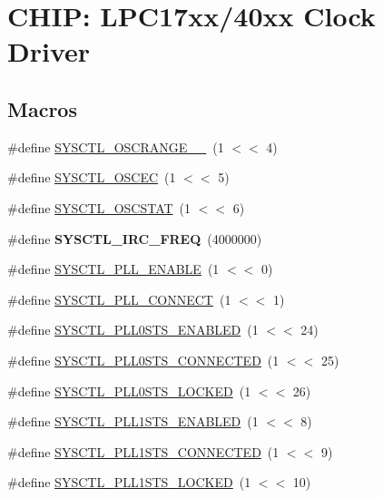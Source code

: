 \hypertarget{group___c_l_o_c_k__17_x_x__40_x_x}{\section{C\+H\+I\+P\+: L\+P\+C17xx/40xx Clock Driver}
\label{group___c_l_o_c_k__17_x_x__40_x_x}
}
\subsection*{Macros}
\begin{DoxyCompactItemize}
\item 
\#define \hyperlink{group___c_l_o_c_k__17_x_x__40_x_x_gaf04369ab801acde194d9ffa65437364b}{S\+Y\+S\+C\+T\+L\+\_\+\+O\+S\+C\+R\+A\+N\+G\+E\+\_\+\_}~(1 $<$$<$ 4)
\item 
\#define \hyperlink{group___c_l_o_c_k__17_x_x__40_x_x_ga590cc793271161c9b49e27345956b527}{S\+Y\+S\+C\+T\+L\+\_\+\+O\+S\+C\+E\+C}~(1 $<$$<$ 5)
\item 
\#define \hyperlink{group___c_l_o_c_k__17_x_x__40_x_x_gae0252af1bba39952df3137fc471ae395}{S\+Y\+S\+C\+T\+L\+\_\+\+O\+S\+C\+S\+T\+A\+T}~(1 $<$$<$ 6)
\item 
\hypertarget{group___c_l_o_c_k__17_x_x__40_x_x_gadec816f1cc26d1b3c4a954d5e791e9c0}{\#define {\bfseries S\+Y\+S\+C\+T\+L\+\_\+\+I\+R\+C\+\_\+\+F\+R\+E\+Q}~(4000000)}\label{group___c_l_o_c_k__17_x_x__40_x_x_gadec816f1cc26d1b3c4a954d5e791e9c0}

\item 
\#define \hyperlink{group___c_l_o_c_k__17_x_x__40_x_x_ga78f6b62e70d59854ada7a72d6a01893d}{S\+Y\+S\+C\+T\+L\+\_\+\+P\+L\+L\+\_\+\+E\+N\+A\+B\+L\+E}~(1 $<$$<$ 0)
\item 
\#define \hyperlink{group___c_l_o_c_k__17_x_x__40_x_x_ga4e33171ff00818ed7a62cd953eadc725}{S\+Y\+S\+C\+T\+L\+\_\+\+P\+L\+L\+\_\+\+C\+O\+N\+N\+E\+C\+T}~(1 $<$$<$ 1)
\item 
\#define \hyperlink{group___c_l_o_c_k__17_x_x__40_x_x_gac41b20558f47e27cbe618dbe33db470a}{S\+Y\+S\+C\+T\+L\+\_\+\+P\+L\+L0\+S\+T\+S\+\_\+\+E\+N\+A\+B\+L\+E\+D}~(1 $<$$<$ 24)
\item 
\#define \hyperlink{group___c_l_o_c_k__17_x_x__40_x_x_ga6ed64c74717a9360b3f6ee8756c5cfd0}{S\+Y\+S\+C\+T\+L\+\_\+\+P\+L\+L0\+S\+T\+S\+\_\+\+C\+O\+N\+N\+E\+C\+T\+E\+D}~(1 $<$$<$ 25)
\item 
\#define \hyperlink{group___c_l_o_c_k__17_x_x__40_x_x_ga6facab939c95a89e63fc07b960f0348a}{S\+Y\+S\+C\+T\+L\+\_\+\+P\+L\+L0\+S\+T\+S\+\_\+\+L\+O\+C\+K\+E\+D}~(1 $<$$<$ 26)
\item 
\#define \hyperlink{group___c_l_o_c_k__17_x_x__40_x_x_gabb0301239d0c370ef97a1e9463f9d17d}{S\+Y\+S\+C\+T\+L\+\_\+\+P\+L\+L1\+S\+T\+S\+\_\+\+E\+N\+A\+B\+L\+E\+D}~(1 $<$$<$ 8)
\item 
\#define \hyperlink{group___c_l_o_c_k__17_x_x__40_x_x_ga0193028000d11642d35e6e69776258ed}{S\+Y\+S\+C\+T\+L\+\_\+\+P\+L\+L1\+S\+T\+S\+\_\+\+C\+O\+N\+N\+E\+C\+T\+E\+D}~(1 $<$$<$ 9)
\item 
\#define \hyperlink{group___c_l_o_c_k__17_x_x__40_x_x_ga4885e14837c3f1cc44d84e24805f382f}{S\+Y\+S\+C\+T\+L\+\_\+\+P\+L\+L1\+S\+T\+S\+\_\+\+L\+O\+C\+K\+E\+D}~(1 $<$$<$ 10)
\end{DoxyCompactItemize}
